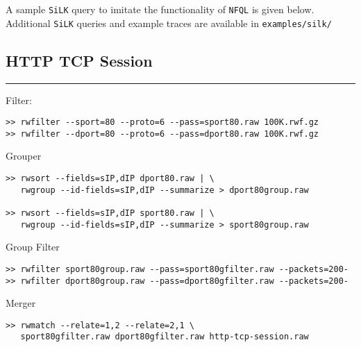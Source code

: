 A sample \lstinline!SiLK! query to imitate the functionality of
\lstinline!NFQL! is given below.\\Additional \lstinline!SiLK! queries
and example traces are available in \lstinline!examples/silk/!

\subsection{HTTP TCP Session}

\begin{center}\rule{3in}{0.4pt}\end{center}

Filter:

\begin{lstlisting}
>> rwfilter --sport=80 --proto=6 --pass=sport80.raw 100K.rwf.gz
>> rwfilter --dport=80 --proto=6 --pass=dport80.raw 100K.rwf.gz 
\end{lstlisting}

Grouper

\begin{lstlisting}
>> rwsort --fields=sIP,dIP dport80.raw | \ 
   rwgroup --id-fields=sIP,dIP --summarize > dport80group.raw

>> rwsort --fields=sIP,dIP sport80.raw | \
   rwgroup --id-fields=sIP,dIP --summarize > sport80group.raw   
\end{lstlisting}

Group Filter

\begin{lstlisting}
>> rwfilter sport80group.raw --pass=sport80gfilter.raw --packets=200-
>> rwfilter dport80group.raw --pass=dport80gfilter.raw --packets=200-
\end{lstlisting}

Merger

\begin{lstlisting}
>> rwmatch --relate=1,2 --relate=2,1 \
   sport80gfilter.raw dport80gfilter.raw http-tcp-session.raw
\end{lstlisting}

